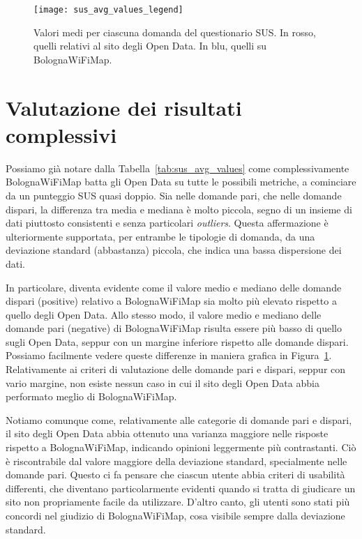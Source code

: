 \begin{figure}[H]
    \centering
    \texttt{[image: sus\_avg\_values\_legend]}
    \caption[Valori medi per ciascuna domanda del questionario SUS]{Valori medi per ciascuna domanda del questionario SUS. In rosso, quelli relativi al sito degli Open Data. In blu, quelli su BolognaWiFiMap.}
    \label{fig:sus_avg_values}
\end{figure}

\section{Valutazione dei risultati complessivi}
Possiamo già notare dalla Tabella~\ref{tab:sus_avg_values} come complessivamente BolognaWiFiMap batta gli Open Data su tutte le possibili metriche, a cominciare da un punteggio SUS quasi doppio. Sia nelle domande pari, che nelle domande dispari, la differenza tra media e mediana è molto piccola, segno di un insieme di dati piuttosto consistenti e senza particolari \textit{outliers}. Questa affermazione è ulteriormente supportata, per entrambe le tipologie di domanda, da una deviazione standard (abbastanza) piccola, che indica una bassa dispersione dei dati.

In particolare, diventa evidente come il valore medio e mediano delle domande dispari (positive) relativo a BolognaWiFiMap sia molto più elevato rispetto a quello degli Open Data. Allo stesso modo, il valore medio e mediano delle domande pari (negative) di BolognaWiFiMap risulta essere più basso di quello sugli Open Data, seppur con un margine inferiore rispetto alle domande dispari. Possiamo facilmente vedere queste differenze in maniera grafica in Figura~\ref{fig:sus_avg_values}. Relativamente ai criteri di valutazione delle domande pari e dispari, seppur con vario margine, non esiste nessun caso in cui il sito degli Open Data abbia performato meglio di BolognaWiFiMap.

Notiamo comunque come, relativamente alle categorie di domande pari e dispari, il sito degli Open Data abbia ottenuto una varianza maggiore nelle risposte rispetto a BolognaWiFiMap, indicando opinioni leggermente più contrastanti. Ciò è riscontrabile dal valore maggiore della deviazione standard, specialmente nelle domande pari. Questo ci fa pensare che ciascun utente abbia criteri di usabilità differenti, che diventano particolarmente evidenti quando si tratta di giudicare un sito non propriamente facile da utilizzare. D'altro canto, gli utenti sono stati più concordi nel giudizio di BolognaWiFiMap, cosa visibile sempre dalla deviazione standard.

